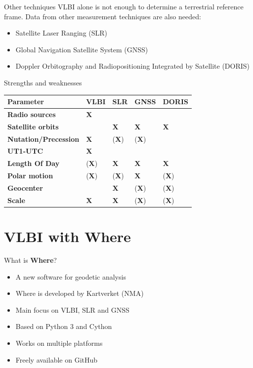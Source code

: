 \documentclass[14pt,table,t, c]{beamer}
\begin{document}
\begin{frame}{Other techniques}
VLBI alone is not enough to determine a terrestrial reference frame. Data from other measurement techniques are also
needed:
\vspace*{1em}
\begin{itemize}
  \item Satellite Laser Ranging (SLR)
  \item Global Navigation Satellite System (GNSS)
  \item Doppler Orbitography and Radiopositioning Integrated by Satellite (DORIS)
\end{itemize}
\end{frame}

\begin{frame}[fragile,c]{Strengths and weaknesses}
\centering
\footnotesize
{}
 \begin{tabularx}{\textwidth}{|l|Y|Y|Y|Y|}
	\hline
		\textbf{Parameter} & \textbf{VLBI} & \textbf{SLR} & \textbf{GNSS} & \textbf{DORIS}\\
  	\hline
    \textbf{Radio sources} & \textbf{X} & & &  \\
	\hline
	\hline
	\textbf{Satellite orbits} &  & \textbf{X} & \textbf{X} & \textbf{X}  \\
    \hline
    \hline
    \textbf{Nutation/Precession} & \textbf{X} & (\textbf{X}) & (\textbf{X}) & \\
    \hline
    \textbf{UT1-UTC} & \textbf{X} & & & \\
    \hline
    \textbf{Length Of Day} & (\textbf{X}) & \textbf{X} & \textbf{X} & \textbf{X} \\
    \hline
    \textbf{Polar motion} & (\textbf{X}) & (\textbf{X}) & \textbf{X} & (\textbf{X}) \\
    \hline
    \hline
    \textbf{Geocenter} & & \textbf{X} & (\textbf{X}) & (\textbf{X}) \\
    \hline
    \textbf{Scale} & \textbf{X} & \textbf{X} & (\textbf{X}) & (\textbf{X}) \\
    \hline
\end{tabularx}
\end{frame}

\part{VLBI with Where}

\begin{frame}{What is \textbf{Where}?}
\begin{itemize}
  \item A new software for geodetic analysis
  \item Where is developed by Kartverket (NMA)
  \item Main focus on VLBI, SLR and GNSS
  \item Based on Python 3 and Cython
  \item Works on multiple platforms
  \item Freely available on GitHub
\end{itemize}
\end{frame}
\end{document}
